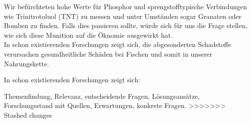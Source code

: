 Wir befürchteten hohe Werte für Phosphor und sprengstofftypische Verbindungen wie Trinitrotoluol (TNT) 
zu messen und unter Umständen sogar Granaten oder Bomben zu finden. Falls dies passieren sollte, würde 
sich für uns die Frage stellen, wie sich diese Munition auf die Öknomie ausgewirkt hat. \\

In schon existierenden Forschungen zeigt sich, die abgesonderten Schadstoffe verursachen gesundheitliche Schäden bei Fischen 
und somit in unserer Nahrungskette. 
%
%
%


In schon existierenden Forschungen\cite{munitionsbelastung} zeigt sich:




Themenfindung, Relevanz, entscheidende Fragen, Lösungsansätze, Forschungsstand mit Quellen, Erwartungen, konkrete Fragen.
>>>>>>> Stashed changes
